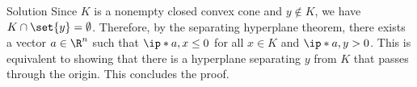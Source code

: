 \documentclass{article}
\theoremstyle{plain}
\theoremstyle{definition}
\theoremstyle{remark}
\begin{document}
\begin{solution}
    {Solution}
    Since $K$ is a nonempty closed convex cone and $y\notin K$, we have $K\cap\set{y}=\emptyset$. Therefore, by the separating hyperplane theorem, there exists a vector $a\in \R^n$ such that $\ip*{a,x}\leq 0$ for all $x\in K$ and $\ip*{a,y}>0$. This is equivalent to showing that there is a hyperplane separating $y$ from $K$ that passes through the origin. This concludes the proof.
\end{solution}
\end{document}
